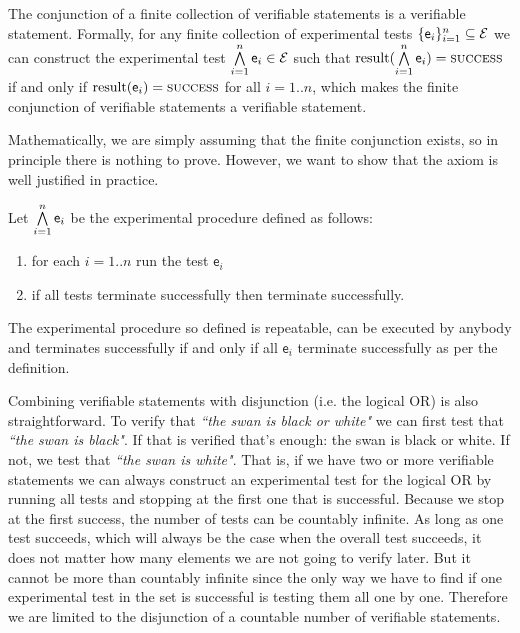 \documentclass[11pt,letterpaper,fleqn]{memoir} %
\begin{document}
\begin{mathSection}
	\begin{axiom}\label{def_experimental_test_AND}
	The conjunction of a finite collection of verifiable statements is a verifiable statement. Formally, for any finite collection of experimental tests $\{\mathsf{e}_i\}_{i=1}^{n} \subseteq \mathcal{E}$ we can construct the experimental test $ \bigwedge\limits_{i=1}^{n} \mathsf{e}_i \in \mathcal{E}$ such that $\operatorname{result}(\bigwedge\limits_{i=1}^{n} \mathsf{e}_i) = \textsc{success}$ if and only if $\operatorname{result}(\mathsf{e}_i) = \textsc{success}$ for all $i=1..n$, which makes the finite conjunction of verifiable statements a verifiable statement.
	\end{axiom}
	\begin{justification}
		Mathematically, we are simply assuming that the finite conjunction exists, so in principle there is nothing to prove. However, we want to show that the axiom is well justified in practice.
		
		Let $\bigwedge\limits_{i=1}^{n} \mathsf{e}_i$ be the experimental procedure defined as follows:
		\begin{enumerate}
			\item for each $i=1..n$ run the test $\mathsf{e}_i$
			\item if all tests terminate successfully then terminate successfully.
		\end{enumerate}
		The experimental procedure so defined is repeatable, can be executed by anybody and terminates successfully if and only if all $\mathsf{e}_i$ terminate successfully as per the definition.
	\end{justification}
\end{mathSection}	

Combining verifiable statements with disjunction (i.e. the logical OR) is also straightforward. To verify that \emph{``the swan is black or white"} we can first test that \emph{``the swan is black"}. If that is verified that's enough: the swan is black or white. If not, we test that \emph{``the swan is white"}. That is, if we have two or more verifiable statements we can always construct an experimental test for the logical OR by running all tests and stopping at the first one that is successful. Because we stop at the first success, the number of tests can be countably infinite. As long as one test succeeds, which will always be the case when the overall test succeeds, it does not matter how many elements we are not going to verify later. But it cannot be more than countably infinite since the only way we have to find if one experimental test in the set is successful is testing them all one by one. Therefore we are limited to the disjunction of a countable number of verifiable statements.
\end{document}

